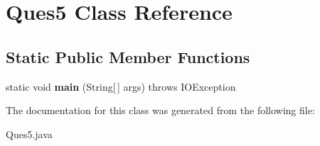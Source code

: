 \hypertarget{class_ques5}{}\section{Ques5 Class Reference}
\label{class_ques5}
\subsection*{Static Public Member Functions}
\begin{DoxyCompactItemize}
\item 
\mbox{\label{class_ques5_a561a33481def44b30f8606d64001a65a}} 
static void {\bfseries main} (String\mbox{[}$\,$\mbox{]} args)  throws I\+O\+Exception
\end{DoxyCompactItemize}


The documentation for this class was generated from the following file\+:\begin{DoxyCompactItemize}
\item 
Ques5.\+java\end{DoxyCompactItemize}
